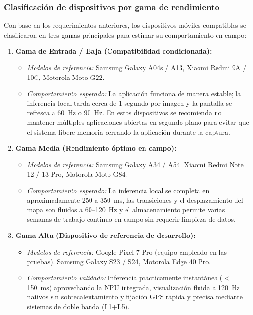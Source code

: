 \subsubsection{Clasificación de dispositivos por gama de rendimiento}
\label{subsubsec:clasificacion-gamas}

Con base en los requerimientos anteriores, los dispositivos móviles compatibles se clasificaron en tres gamas principales para estimar su comportamiento en campo:

\begin{enumerate}[label=\textbf{\arabic*.}]
    \item \textbf{Gama de Entrada / Baja (Compatibilidad condicionada):}
    \begin{itemize}
        \item \textit{Modelos de referencia:} Samsung Galaxy A04s / A13, Xiaomi Redmi 9A / 10C, Motorola Moto G22.
        \item \textit{Comportamiento esperado:} La aplicación funciona de manera estable; la inferencia local tarda cerca de 1 segundo por imagen y la pantalla se refresca a 60~Hz o 90~Hz. En estos dispositivos se recomienda no mantener múltiples aplicaciones abiertas en segundo plano para evitar que el sistema libere memoria cerrando la aplicación durante la captura.
    \end{itemize}
    
    \item \textbf{Gama Media (Rendimiento óptimo en campo):}
    \begin{itemize}
        \item \textit{Modelos de referencia:} Samsung Galaxy A34 / A54, Xiaomi Redmi Note 12 / 13 Pro, Motorola Moto G84.
        \item \textit{Comportamiento esperado:} La inferencia local se completa en aproximadamente 250 a 350~ms, las transiciones y el desplazamiento del mapa son fluidos a 60--120~Hz y el almacenamiento permite varias semanas de trabajo continuo en campo sin requerir limpieza de datos.
    \end{itemize}
    
    \item \textbf{Gama Alta (Dispositivo de referencia de desarrollo):}
    \begin{itemize}
        \item \textit{Modelos de referencia:} Google Pixel 7 Pro (equipo empleado en las pruebas), Samsung Galaxy S23 / S24, Motorola Edge 40 Pro.
        \item \textit{Comportamiento validado:} Inferencia prácticamente instantánea ($<$150~ms) aprovechando la NPU integrada, visualización fluida a 120~Hz nativos sin sobrecalentamiento y fijación GPS rápida y precisa mediante sistemas de doble banda (L1+L5).
    \end{itemize}
\end{enumerate}

